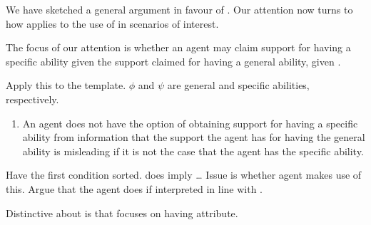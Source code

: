 \begin{note}
  We have sketched a general argument in favour of \nI{}.
  Our attention now turns to how \nI{} applies to the use of \aben{} in scenarios of interest.

  The focus of our attention is whether an agent may claim support for having a specific ability given the support claimed for having a general ability, given \gsi{}.

  Apply this to the \nI{} template.
  \(\phi\) and \(\psi\) are general and specific abilities, respectively.

  \begin{enumerate}[label=\nI{}, ref=\nI{}]
  \item An agent does not have the option of obtaining support for having a specific ability from information that the support the agent has for having the general ability is misleading if it is not the case that the agent has the specific ability.
  \end{enumerate}

  Have the first condition sorted.
  \gsi{} does imply \dots
  Issue is whether agent makes use of this.
  Argue that the agent does if interpreted in line with \AR{}.

  Distinctive about \AR{} is that focuses on having attribute.
\end{note}

